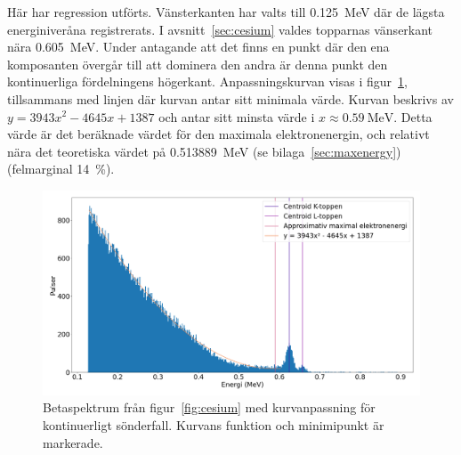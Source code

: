 Här har regression utförts. Vänsterkanten har valts till \qty{0.125}{\MeV} där
de lägsta energiniveråna registrerats. I avsnitt~\ref{sec:cesium} valdes
topparnas vänserkant nära \qty{0.605}{\MeV}. Under antagande att det finns en
punkt där den ena komposanten övergår till att dominera den andra är denna
punkt den kontinuerliga fördelningens högerkant. Anpassningskurvan visas i
figur~\ref{fig:cesiumcurve}, tillsammans med linjen där kurvan antar sitt
minimala värde. Kurvan beskrivs av
$y = \num{3943}x^2 - \num{4645}x + \num{1387}$ och antar sitt minsta värde i
$x \approx \qty{0.59}{\MeV}$. Detta värde är det beräknade värdet för den
maximala elektronenergin, och relativt nära det teoretiska värdet på
\qty{0.513889}{\MeV} (se bilaga~\ref{sec:maxenergy}) (felmarginal
\qty{14}{\percent}).

\begin{figure}[!hp]
    \centering
    \includegraphics[width=\textwidth, keepaspectratio]{../images/cesium_curve.png}
    \caption{
        Betaspektrum från figur~\ref{fig:cesium} med kurvanpassning för
        kontinuerligt sönderfall. Kurvans funktion och minimipunkt är
        markerade.
    }
    \label{fig:cesiumcurve}
\end{figure}
